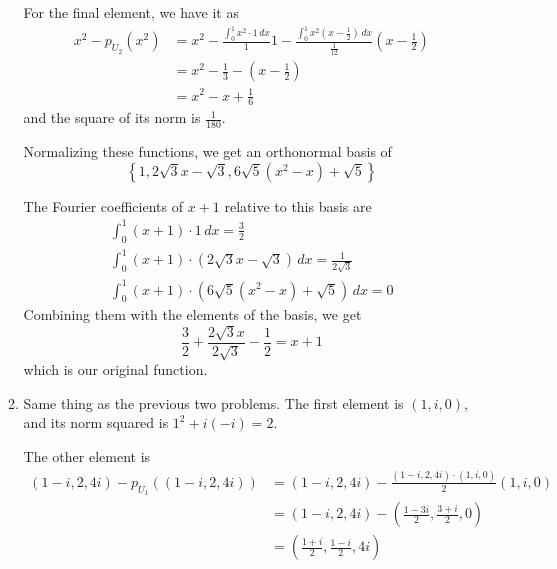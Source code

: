 \documentclass[12pt]{article}
\begin{document}
\begin{enumerate}
\begin{enumerate}
                        For the final element, we have it as
                        \begin{align*}
                              x^2-p_{U_2}(x^2) & = x^2-\frac{\int_0^1 x^2\cdot 1\,dx}{1}1-
                              \frac{\int_0^1 x^2\left(x-\frac{1}{2}\right)\,dx}{\frac{1}{12}}\left(x-\frac{1}{2}\right) \\
                                               & = x^2-\frac{1}{3}-\left(x-\frac{1}{2}\right)                           \\
                                               & = x^2-x+\frac{1}{6}
                        \end{align*}
                        and the square of its norm is $\frac{1}{180}$.

                        Normalizing these functions, we get an orthonormal basis of
                        \[\left\{1, 2\sqrt{3}x-\sqrt{3}, 6\sqrt{5}(x^2-x)+\sqrt{5}\right\}\]

                        The Fourier coefficients of $x+1$ relative to this basis are
                        \begin{gather*}
                              \int_0^1 (x+1) \cdot 1\,dx=\frac{3}{2} \\
                              \int_0^1 (x+1) \cdot \left(2\sqrt{3}x-\sqrt{3}\right)\,dx=\frac{1}{2\sqrt{3}} \\
                              \int_0^1 (x+1) \cdot \left(6\sqrt{5}(x^2-x)+\sqrt{5}\right)\,dx=0
                        \end{gather*}
                        Combining them with the elements of the basis, we get
                        \[\frac{3}{2}+\frac{2\sqrt{3}x}{2\sqrt{3}}-\frac{1}{2}=x+1\]
                        which is our original function.
                  \item Same thing as the previous two problems.
                        The first element is $(1, i, 0)$, and its norm squared is $1^2+i(-i)=2$.

                        The other element is
                        \begin{align*}
                              (1-i, 2, 4i) - p_{U_1}((1-i, 2, 4i)) & =(1-i, 2, 4i) - \frac{(1-i, 2, 4i) \cdot (1, i, 0)}{2}(1, i, 0) \\
                                                                   & = (1-i, 2, 4i)-\left(\frac{1-3i}{2}, \frac{3+i}{2}, 0\right)    \\
                                                                   & = \left(\frac{1+i}{2},\frac{1-i}{2},4i\right)
                        \end{align*}


\end{enumerate}
\end{enumerate}
\end{document}
